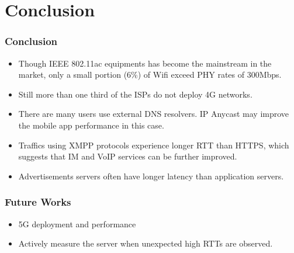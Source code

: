 \section{Conclusion}

\begin{frame}
    \frametitle{Conclusion}
    \begin{itemize}
        \item Though IEEE 802.11ac equipments has become the mainstream in the market, only a small portion (6\%) of Wifi exceed PHY rates of 300Mbps.
        \item Still more than one third of the ISPs do not deploy 4G networks.
        \item There are many users use external DNS resolvers. IP Anycast may improve the mobile app performance in this case.
        \item Traffics using XMPP protocols experience longer RTT than HTTPS, which suggests that IM and VoIP services can be further improved.
        \item Advertisements servers often have longer latency than application servers.
    \end{itemize}
\end{frame}

\begin{frame}
    \frametitle{Future Works}

    \begin{itemize}
        \item 5G deployment and performance
        \item Actively measure the server when unexpected high RTTs are observed.
    \end{itemize}
\end{frame}